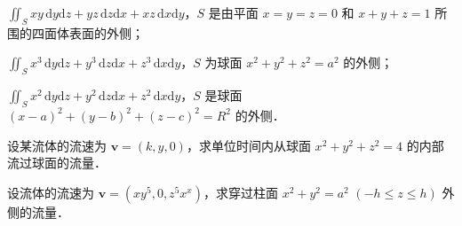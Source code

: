 \begin{xiti}
\begin{ziti}
\item $\displaystyle\iint_{S}xy\,\mathrm{d}y\mathrm{d}z+yz\,\mathrm{d}z\mathrm{d}x+xz\,\mathrm{d}x\mathrm{d}y$，$S$ 是由平面 $x=y=z=0$ 和 $x+y+z=1$ 所围的四面体表面的外侧；
\item $\displaystyle\iint_{S}x^{3}\,\mathrm{d}y\mathrm{d}z+y^{3}\,\mathrm{d}z\mathrm{d}x+z^{3}\,\mathrm{d}x\mathrm{d}y$，$S$ 为球面 $x^{2}+y^{2}+z^{2}=a^{2}$ 的外侧；
\item $\displaystyle\iint_{S}x^{2}\,\mathrm{d}y\mathrm{d}z+y^{2}\,\mathrm{d}z\mathrm{d}x+z^{2}\,\mathrm{d}x\mathrm{d}y$，$S$ 是球面 $(x-a)^{2}+(y-b)^{2}+(z-c)^{2}=R^{2}$ 的外侧．
\end{ziti}
\item 设某流体的流速为 $\bm{v}=(k,y,0)$，求单位时间内从球面 $x^{2}+y^{2}+z^{2}=4$ 的内部流过球面的流量．
\item 设流体的流速为 $\bm{v}=\left(xy^{5},0,z^{5}x^{x}\right)$，求穿过柱面 $x^{2}+y^{2}=a^{2}$ $(-h\leqslant z\leqslant h)$ 外侧的流量．
\end{xiti}
